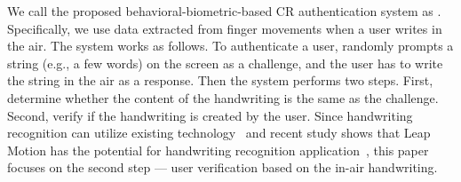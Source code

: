 We call the proposed behavioral-biometric-based CR authentication system as \CiT. Specifically, we use data extracted from finger movements when a user writes in the air.
The \CiT system works as follows. To authenticate a user, \CiT randomly prompts a string (e.g., a few words) on the screen as a challenge, and the user has to write the string in the air as a response. Then the system performs two steps. First, determine whether the content of the handwriting is the same as the challenge. Second, verify if the handwriting is created by the user. Since  handwriting recognition can utilize existing technology~\cite{Tappert1990} and recent study shows that Leap Motion has the potential for handwriting recognition application~\cite{Vikram_handwritingleap, ICDAR15:OnlineHandwriting}, this paper focuses on the second step --- user verification based on the in-air handwriting. 


